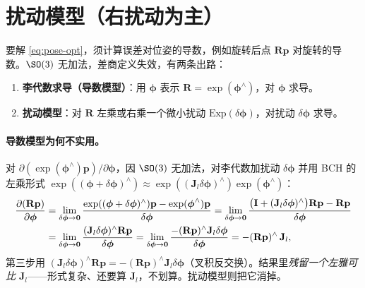 \section{扰动模型（右扰动为主）}
\label{sec:perturb}

要解 \cref{eq:pose-opt}，须计算误差对位姿的导数，例如旋转后点 $\mathbf{R}\mathbf{p}$ 对旋转的导数。$\SO(3)$ 无加法，差商定义失效，有两条出路\cite{gaoxiang2019slam14}：

\begin{enumerate}
  \item \textbf{李代数求导（导数模型）}：用 $\boldsymbol{\phi}$ 表示 $\mathbf{R}=\exp(\boldsymbol{\phi}^\wedge)$，对 $\boldsymbol{\phi}$ 求导。
  \item \textbf{扰动模型}：对 $\mathbf{R}$ 左乘或右乘一个微小扰动 $\mathrm{Exp}(\delta\boldsymbol{\phi})$，对扰动 $\delta\boldsymbol{\phi}$ 求导。
\end{enumerate}

\paragraph{导数模型为何不实用。}对 $\partial(\exp(\boldsymbol{\phi}^\wedge)\mathbf{p})/\partial\boldsymbol{\phi}$，因 $\SO(3)$ 无加法，对李代数加扰动 $\delta\boldsymbol{\phi}$ 并用 BCH 的左乘形式 $\exp((\boldsymbol{\phi}+\delta\boldsymbol{\phi})^\wedge)\approx\exp((\mathbf{J}_l\delta\boldsymbol{\phi})^\wedge)\exp(\boldsymbol{\phi}^\wedge)$：
\begin{align}
  \frac{\partial(\mathbf{R}\mathbf{p})}{\partial\boldsymbol{\phi}}
  &=\lim_{\delta\boldsymbol{\phi}\to\mathbf{0}}\frac{\exp((\boldsymbol{\phi}+\delta\boldsymbol{\phi})^\wedge)\mathbf{p}-\exp(\boldsymbol{\phi}^\wedge)\mathbf{p}}{\delta\boldsymbol{\phi}}
   =\lim_{\delta\boldsymbol{\phi}\to\mathbf{0}}\frac{\big(\mathbf{I}+(\mathbf{J}_l\delta\boldsymbol{\phi})^\wedge\big)\mathbf{R}\mathbf{p}-\mathbf{R}\mathbf{p}}{\delta\boldsymbol{\phi}}\notag\\
  &=\lim_{\delta\boldsymbol{\phi}\to\mathbf{0}}\frac{(\mathbf{J}_l\delta\boldsymbol{\phi})^\wedge\mathbf{R}\mathbf{p}}{\delta\boldsymbol{\phi}}
   =\lim_{\delta\boldsymbol{\phi}\to\mathbf{0}}\frac{-(\mathbf{R}\mathbf{p})^\wedge\mathbf{J}_l\delta\boldsymbol{\phi}}{\delta\boldsymbol{\phi}}
   =-(\mathbf{R}\mathbf{p})^\wedge\,\mathbf{J}_l,
  \label{eq:deriv-model}
\end{align}
第三步用 $(\mathbf{J}_l\delta\boldsymbol{\phi})^\wedge\mathbf{R}\mathbf{p}=-(\mathbf{R}\mathbf{p})^\wedge\mathbf{J}_l\delta\boldsymbol{\phi}$（叉积反交换）。结果里\emph{残留一个左雅可比 $\mathbf{J}_l$}——形式复杂、还要算 $\mathbf{J}_l$，不划算。扰动模型则把它消掉。

